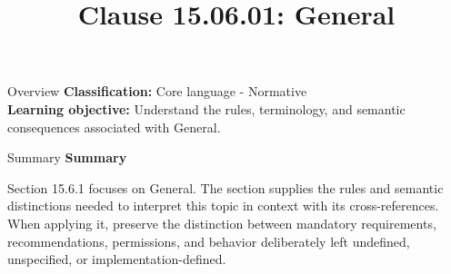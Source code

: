 \documentclass[10pt,letterpaper]{article}
\title{Clause 15.06.01: General}
\author{}
\date{}
\begin{document}
\maketitle
\begin{CornellOverviewBox}{Overview}
\textbf{Classification:} Core language - Normative\\[2pt]
\textbf{Learning objective:} Understand the rules, terminology, and semantic consequences associated with General.
\end{CornellOverviewBox}\begin{CornellSummaryBox}{Summary}
{\sffamily\bfseries\color{Accent} Summary}\par\vspace{3pt}Section 15.6.1 focuses on General. The section supplies the rules and semantic distinctions needed to interpret this topic in context with its cross-references. When applying it, preserve the distinction between mandatory requirements, recommendations, permissions, and behavior deliberately left undefined, unspecified, or implementation-defined.
\end{CornellSummaryBox}
\end{document}
